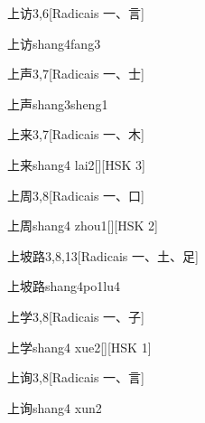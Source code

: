\begin{entry}{上访}{3,6}[Radicais ⼀、⾔]
  \begin{phonetics}{上访}{shang4fang3}
  \end{phonetics}
\end{entry}

\begin{entry}{上声}{3,7}[Radicais ⼀、⼠]
  \begin{phonetics}{上声}{shang3sheng1}
  \end{phonetics}
\end{entry}

\begin{entry}{上来}{3,7}[Radicais ⼀、⽊]
  \begin{phonetics}{上来}{shang4 lai2}[][HSK 3]
  \end{phonetics}
\end{entry}

\begin{entry}{上周}{3,8}[Radicais ⼀、⼝]
  \begin{phonetics}{上周}{shang4 zhou1}[][HSK 2]
  \end{phonetics}
\end{entry}

\begin{entry}{上坡路}{3,8,13}[Radicais ⼀、⼟、⾜]
  \begin{phonetics}{上坡路}{shang4po1lu4}
  \end{phonetics}
\end{entry}

\begin{entry}{上学}{3,8}[Radicais ⼀、⼦]
  \begin{phonetics}{上学}{shang4 xue2}[][HSK 1]
  \end{phonetics}
\end{entry}

\begin{entry}{上询}{3,8}[Radicais ⼀、⾔]
  \begin{phonetics}{上询}{shang4 xun2}
  \end{phonetics}
\end{entry}


